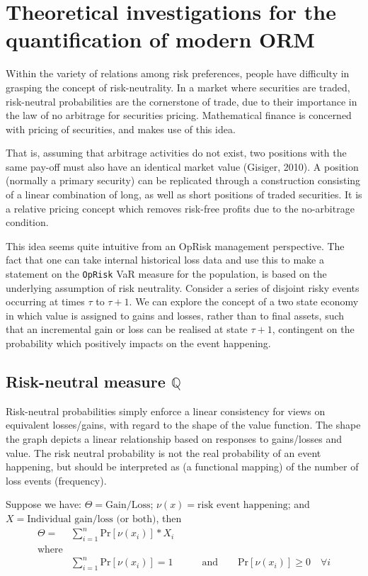 \documentclass{DissertateUSU}
\begin{document}
\section{Theoretical investigations for the quantification of modern ORM}

Within the variety of relations among risk preferences, people have
difficulty in grasping the concept of risk-neutrality. In a market where
securities are traded, risk-neutral probabilities are the cornerstone of
trade, due to their importance in the law of no arbitrage for securities
pricing. Mathematical finance is concerned with pricing of securities,
and makes use of this idea.\medskip

That is, assuming that arbitrage activities do not exist, two positions
with the same pay-off must also have an identical market value (Gisiger,
2010). A position (normally a primary security) can be replicated
through a construction consisting of a linear combination of long, as
well as short positions of traded securities. It is a relative pricing
concept which removes risk-free profits due to the no-arbitrage
condition.\medskip

This idea seems quite intuitive from an OpRisk management perspective.
The fact that one can take internal historical loss data and use this to
make a statement on the \texttt{OpRisk} VaR measure for the population,
is based on the underlying assumption of risk neutrality. Consider a
series of disjoint risky events occurring at times \(\tau\) to
\(\tau + 1\). We can explore the concept of a two state economy in which
value is assigned to gains and losses, rather than to final assets, such
that an incremental gain or loss can be realised at state \(\tau + 1\),
contingent on the probability which positively impacts on the event
happening.\medskip

\subsection{Risk-neutral measure $\mathbb{Q}$}

Risk-neutral probabilities simply enforce a linear consistency for views
on equivalent losses/gains, with regard to the shape of the value
function. The shape the graph depicts a linear relationship based on
responses to gains/losses and value. The risk neutral probability is not
the real probability of an event happening, but should be interpreted as
(a functional mapping) of the number of loss events (frequency).\medskip

Suppose we have: \(\Theta = \mbox{Gain/Loss}\);
\(\nu(x) = \mbox{risk event happening}\); and
\(X = \mbox{Individual gain/loss (or both)}\), then
\begin{eqnarray}\label{eqn3}
\Theta = &\sum_{i=1}^{n}\mbox{Pr}[\nu (x_{i})]*X_i & \\
 \mbox{where} \nonumber\\
&\sum_{i=1}^{n}\mbox{Pr}[\nu (x_{i})] = 1 &\qquad \mbox{and} \qquad \mbox{Pr}[\nu (x_{i})] \geq 0 \quad \forall i\nonumber
\end{eqnarray}
\end{document}

